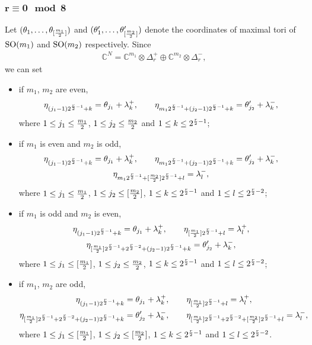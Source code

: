 \documentclass[10pt,a4paper]{amsart}
\numberwithin{equation}{section}
\begin{document}
\subsubsection[$r\equiv 0 \mod 8$]{$\boldsymbol{r\equiv 0 \mod 8}$}
Let $(\theta_1,\dots,\theta_{[{m_1\over2}]})$ and $(\theta_1',\dots,\theta_{[{m_2\over2}]}')$ denote the coordinates of maximal tori of ${\rm SO}(m_1)$ and ${\rm SO}(m_2)$ respectively. Since
\begin{gather*}\mathbb{C}^N=\mathbb{C}^{m_1}\otimes \Delta_r^+\oplus\mathbb{C}^{m_2}\otimes \Delta_r^-,\end{gather*}
we can set
\begin{itemize}\itemsep=0pt
 \item if $m_1$, $m_2$ are even,
 \begin{gather*}
 \eta_{(j_1-1)2^{{r\over 2}-1}+k}= \theta_{j_1} + \lambda_k^+, \qquad
 \eta_{m_12^{{r\over 2}-1}+(j_2-1)2^{{r\over 2}-1}+k}= \theta_{j_2}' + \lambda_k^- ,
\end{gather*}
where $1\leq j_1\leq {m_1\over 2}$, $1\leq j_2\leq {m_2\over 2}$ and $1\leq k \leq 2^{{r\over 2}-1}$;

 \item if $m_1$ is even and $m_2$ is odd,
 \begin{gather}
 \eta_{(j_1-1)2^{{r\over 2}-1}+k}= \theta_{j_1} + \lambda_k^+, \qquad
 \eta_{m_12^{{r\over 2}-1}+(j_2-1)2^{{r\over 2}-1}+k}= \theta_{j_2}' + \lambda_k^-, \nonumber\\
 \eta_{m_12^{{r\over 2}-1}+[{m_2\over2}]2^{{r\over 2}-1}+l}= \lambda_l^- ,\label{eq: pesos r=8 m1 even m2 odd}
\end{gather}
where $1\leq j_1\leq {m_1\over 2}$, $1\leq j_2\leq [{m_2\over 2}]$, $1\leq k \leq 2^{{r\over 2}-1}$ and $1\leq l \leq 2^{{r\over 2}-2}$;

 \item if $m_1$ is odd and $m_2$ is even,
 \begin{gather}
 \eta_{(j_1-1)2^{{r\over 2}-1}+k}= \theta_{j_1} + \lambda_k^+, \qquad
 \eta_{[{m_1\over2}]2^{{r\over 2}-1}+l}= \lambda_l^+ ,\nonumber\\
 \eta_{[{m_1\over2}]2^{{r\over 2}-1}+2^{{r\over 2}-2}+(j_2-1)2^{{r\over 2}-1}+k}= \theta_{j_2}'+ \lambda_k^- ,\label{eq: pesos r=8 m1 odd m2 even}
\end{gather}
where $1\leq j_1\leq [{m_1\over 2}]$, $1\leq j_2\leq {m_2\over 2}$, $1\leq k \leq 2^{{r\over 2}-1}$ and $1\leq l \leq 2^{{r\over 2}-2}$;

 \item if $m_1$, $m_2$ are odd,
 \begin{gather*}
 \eta_{(j_1-1)2^{{r\over 2}-1}+k}= \theta_{j_1} + \lambda_k^+, \qquad \eta_{[{m_1\over2}]2^{{r\over 2}-1}+l}= \lambda_l^+ ,\\
 \eta_{[{m_1\over2}]2^{{r\over 2}-1}+2^{{r\over 2}-2}+(j_2-1)2^{{r\over 2}-1}+k}= \theta_{j_2}'+ \lambda_k^- ,\qquad
 \eta_{[{m_1\over2}]2^{{r\over 2}-1}+2^{{r\over 2}-2}+[{m_2\over 2}]2^{{r\over 2}-1}+l}= \lambda_l^- ,
\end{gather*}
where $1\leq j_1\leq [{m_1\over 2}]$, $1\leq j_2\leq [{m_2\over 2}]$, $1\leq k \leq 2^{{r\over 2}-1}$ and $1\leq l \leq 2^{{r\over 2}-2}$.
\end{itemize}
\end{document}
